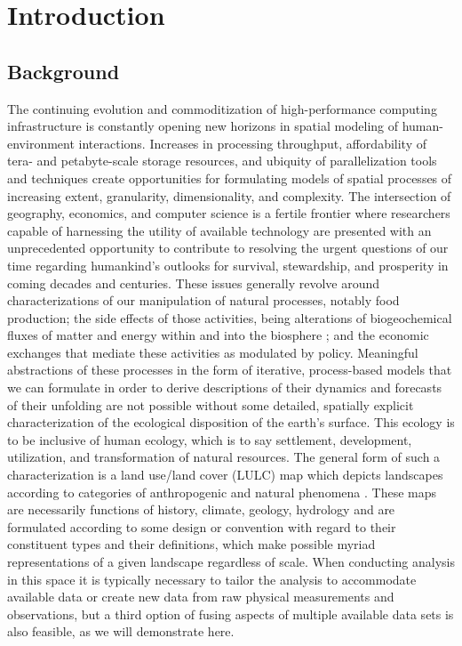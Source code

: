 







\chapter{Introduction}
\label{cha:introduction}

\section{Background}
\label{sec:background}

The continuing evolution and commoditization of high-performance
computing infrastructure is constantly opening new horizons in spatial
modeling of human-environment interactions.  Increases in
processing throughput, affordability of tera- and petabyte-scale
storage resources, and ubiquity of parallelization tools and
techniques create opportunities for formulating models of spatial
processes of increasing extent, granularity, dimensionality, and
complexity.  The intersection of geography, economics, and computer
science is a fertile frontier where researchers capable of harnessing
the utility of available technology are presented with an
unprecedented opportunity to contribute to resolving the urgent
questions of our time regarding humankind's outlooks for survival,
stewardship, and prosperity in coming decades and centuries.  These
issues generally revolve around characterizations of our manipulation
of natural processes, notably food production; the side effects of
those activities, being alterations of biogeochemical fluxes of matter
and energy within and into the biosphere \citep{Sellers1997}; and the
economic exchanges that mediate these activities as modulated by
policy.  Meaningful abstractions of these processes in the form of
iterative, process-based models that we can formulate in order to
derive descriptions of their dynamics and forecasts of their unfolding
are not possible without some detailed, spatially explicit
characterization of the ecological disposition of the earth's surface.
This ecology is to be inclusive of human ecology, which is to say
settlement, development, utilization, and transformation of natural
resources.  The general form of such a characterization is a land
use\slash land cover (LULC) map which depicts landscapes according to
categories of anthropogenic and natural phenomena \citep{Fisher2005a}.
These maps are necessarily functions of history, climate, geology,
hydrology and are formulated according to some design or convention
with regard to their constituent types and their definitions, which
make possible myriad representations of a given landscape regardless
of scale.  When conducting analysis in this space it is typically
necessary to tailor the analysis to accommodate available data or
create new data from raw physical measurements and observations, but a
third option of fusing aspects of multiple available data sets is also
feasible, as we will demonstrate here.

